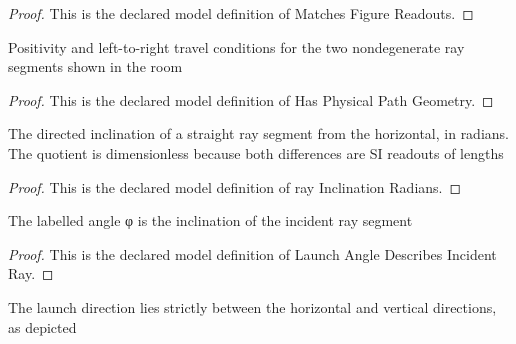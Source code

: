 \begin{proof}
  This is the declared model definition of Matches Figure Readouts.
\end{proof}
\begin{definition}
  \label{def:physics:phyx-mini-0063:phyxminiproblems-problemphyxmini0063-hasphysicalpathgeometry}
  Positivity and left-to-right travel conditions for the two nondegenerate ray segments shown in the room
\end{definition}
\begin{proof}
  This is the declared model definition of Has Physical Path Geometry.
\end{proof}
\begin{definition}
  \label{def:physics:phyx-mini-0063:phyxminiproblems-problemphyxmini0063-rayinclinationradians}
  The directed inclination of a straight ray segment from the horizontal, in radians. The quotient is dimensionless because both differences are SI readouts of lengths
\end{definition}
\begin{proof}
  This is the declared model definition of ray Inclination Radians.
\end{proof}
\begin{definition}
  \label{def:physics:phyx-mini-0063:phyxminiproblems-problemphyxmini0063-launchangledescribesincidentray}
  The labelled angle φ is the inclination of the incident ray segment
\end{definition}
\begin{proof}
  This is the declared model definition of Launch Angle Describes Incident Ray.
\end{proof}
\begin{definition}
  \label{def:physics:phyx-mini-0063:phyxminiproblems-problemphyxmini0063-hasacutelaunchangle}
  The launch direction lies strictly between the horizontal and vertical directions, as depicted
\end{definition}
